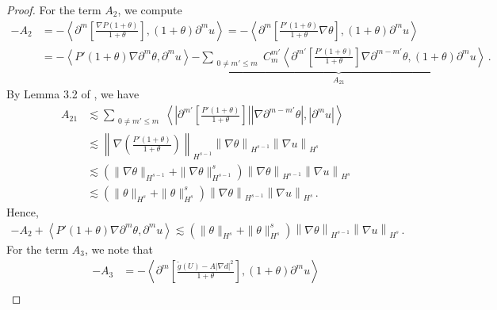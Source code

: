 \documentclass[reqno,11pt]{amsart}
\numberwithin{equation}{section}
\begin{document}
\begin{proof}
For the term $A_2$, we compute 
\begin{equation*}
\begin{aligned}
-A_2&=-\left\langle \partial^m \left[ \frac{\nabla P(1+\theta)}{1+\theta} \right], (1+\theta) \partial^m u \right\rangle = -\left\langle \partial^m \left[ \frac{P'(1+\theta)}{1+\theta} \nabla \theta \right], (1+\theta) \partial^m u \right\rangle \\&
= -\left\langle P'(1+\theta) \nabla \partial^m \theta, \partial^m u \right\rangle 
 \underset{A_{21}}{\underbrace{ - \sum_{\substack{0 \neq m' \leq m}} C_m^{m'} \left\langle \partial^{m'} \left[ \frac{P'(1+\theta)}{1+\theta} \right] \nabla \partial^{m-m'} \theta, (1+\theta) \partial^m u \right\rangle}}
 \,.
\end{aligned}
\end{equation*}
By Lemma 3.2 of \cite{JLT-M3AS-2020}, we have
\begin{equation*}
\begin{aligned}
A_{21}& \lesssim \sum_{\substack{0 \neq m' \leq m}} \left\langle |\partial^{m'} \left[ \frac{P'(1+\theta)}{1+\theta} \right]|| \nabla \partial^{m-m'} \theta|, |\partial^m u |\right\rangle \\&
\lesssim \left\| \nabla \left( \frac{P'(1+\theta)}{1+\theta} \right) \right\|_{H^{s-1}} \left\| \nabla \theta \right\|_{H^{s-1}} \left\| \nabla u \right\|_{H^s} \\&
\lesssim \left( \| \nabla \theta \|_{H^{s-1}} +  \| \nabla \theta \|_{H^{s-1}}^s \right) \left\| \nabla \theta \right\|_{H^{s-1}} \left\| \nabla u \right\|_{H^s} \\&
\lesssim \left( \| \theta \|_{H^s} +  \| \theta \|_{H^s} ^s \right) \left\| \nabla \theta \right\|_{H^{s-1}} \left\| \nabla u \right\|_{H^s} \,.
\end{aligned}
\end{equation*}
Hence,
\begin{equation}\label{u-eq3}
\begin{aligned}
 -A_2 + \left\langle P'(1+\theta) \nabla \partial^m \theta, \partial^m u \right\rangle \lesssim\left( \| \theta \|_{H^s} +  \| \theta \|_{H^s} ^s \right) \left\| \nabla \theta \right\|_{H^{s-1}} \left\| \nabla u \right\|_{H^s} \,.
\end{aligned}
\end{equation}
For the term $A_3$, we note that
\begin{equation*}
\begin{aligned}
-A_3&= -\left\langle \partial^m \left[ \frac{\tilde{g}(U) - A|\nabla d|^2}{1+\theta} \right], (1+\theta)\partial^m u \right\rangle \\

\end{aligned}
\end{equation*}
\end{proof}
\end{document}
